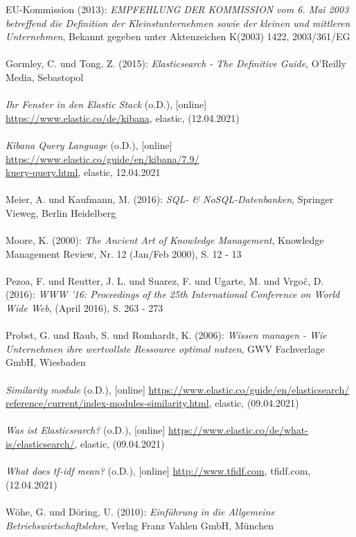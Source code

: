 \documentclass[a4paper]{scrartcl}
\begin{document}
EU-Kommission (2013): \textit{EMPFEHLUNG DER KOMMISSION vom 6. Mai 2003 betreffend die Definition der Kleinstunternehmen sowie der kleinen und mittleren Unternehmen}, Bekannt gegeben unter Aktenzeichen K(2003) 1422, 2003/361/EG \\ \\
Gormley, C. und Tong, Z. (2015): \textit{Elasticsearch - The Definitive Guide}, O'Reilly Media, Sebastopol \\ \\
\textit{Ihr Fenster in den Elastic Stack} (o.D.), [online] \href{https://www.elastic.co/de/kibana}{https://www.elastic.co/de/kibana}, elastic, (12.04.2021) \\ \\
\textit{Kibana Query Language} (o.D.), [online] \href{https://www.elastic.co/guide/en/kibana/7.9/kuery-query.html}{https://www.elastic.co/guide/en/kibana/7.9/ \\ kuery-query.html}, elastic, 12.04.2021 \\ \\
Meier, A. und Kaufmann, M. (2016): \textit{SQL- \& NoSQL-Datenbanken}, Springer Vieweg, Berlin Heidelberg \\ \\
Moore, K. (2000): \textit{The Ancient Art of Knowledge Management}, Knowledge Management Review, Nr. 12 (Jan/Feb 2000), S. 12 - 13 \\ \\
Pezoa, F. und Reutter, J. L. und Suarez, F. und Ugarte, M. und Vrgoč, D. (2016): \textit{WWW '16: Proceedings of the 25th International Conference on World Wide Web}, (April 2016), S. 263 - 273 \\ \\
Probst, G. und Raub, S. und Romhardt, K. (2006): \textit{Wissen managen - Wie Unternehmen ihre wertvollste Ressource optimal nutzen}, GWV Fachverlage GmbH, Wiesbaden \\ \\
\textit{Similarity module} (o.D.), [online] \href{https://www.elastic.co/guide/en/elasticsearch/reference/current/index-modules-similarity.html}{https://www.elastic.co/guide/en/elasticsearch/ \\ reference/current/index-modules-similarity.html}, elastic, (09.04.2021) \\ \\
\textit{Was ist Elasticsearch?} (o.D.), [online] \href{https://www.elastic.co/de/what-is/elasticsearch/}{https://www.elastic.co/de/what-is/elasticsearch/}, elastic, (09.04.2021) \\ \\
\textit{What does tf-idf mean?} (o.D.), [online] \href{http://www.tfidf.com}{http://www.tfidf.com}, tfidf.com, (12.04.2021) \\ \\
Wöhe, G. und Döring, U. (2010): \textit{Einführung in die Allgemeine Betriebswirtschaftslehre}, Verlag Franz Vahlen GmbH, München \\ \\
\end{document}
